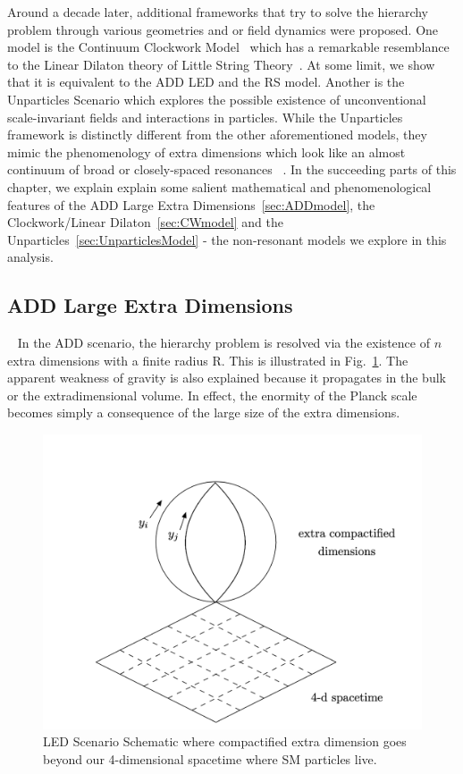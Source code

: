 Around a decade later, additional frameworks that try to solve the hierarchy problem through various geometries and or field dynamics were proposed. One model is the Continuum Clockwork Model~\cite{2Clockwork} which has a remarkable resemblance to the Linear Dilaton theory of Little String Theory~\cite{5LittleStringTheoryAtATeV}. At some limit, we show that it is equivalent to the ADD LED and the RS model. Another is the Unparticles Scenario which explores the possible existence of unconventional scale-invariant fields and interactions in particles. While the Unparticles~\cite{Georgi_2007unpar, Georgi:2007o, Georgi:2007si} framework is distinctly different from the other aforementioned models, they mimic the phenomenology of extra dimensions which look like an almost continuum of broad or closely-spaced resonances ~\cite{Folgado:2020utn}. In the succeeding parts of this chapter, we explain explain some salient mathematical and phenomenological features of the ADD Large Extra Dimensions~\ref{sec:ADDmodel}, the Clockwork/Linear Dilaton~\ref{sec:CWmodel} and the Unparticles~\ref{sec:UnparticlesModel} - the non-resonant models we explore in this analysis.

\subsection{ADD Large Extra Dimensions}~\label{sec:ADDmodel}
In the ADD scenario, the hierarchy problem is resolved via the existence of $n$ extra dimensions with a finite radius R. This is illustrated in Fig.~\ref{fig:LEDSketch}. The apparent weakness of gravity is also explained because it propagates in the bulk or the extradimensional volume. In effect, the enormity of the Planck scale becomes simply a consequence of the large size of the extra dimensions.

\begin{figure}
    \centering
    \includegraphics[scale=0.7]{fig/LEDsketch.png}
    \caption{LED Scenario Schematic where compactified extra dimension goes beyond our 4-dimensional spacetime where SM particles live.~\cite{Kribs:2006mq}}
    \label{fig:LEDSketch}
\end{figure}


